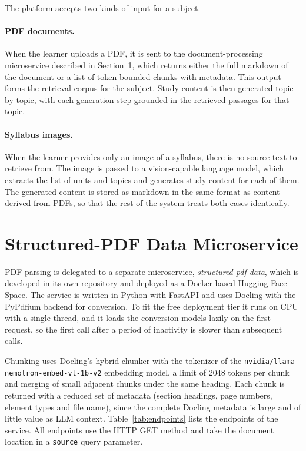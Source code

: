 \documentclass[12pt,a4paper,oneside]{report}
\begin{document}
The platform accepts two kinds of input for a subject.

\paragraph{PDF documents.} When the learner uploads a PDF, it is sent to
the document-processing microservice described in
Section~\ref{sec:pdfservice}, which returns either the full markdown of
the document or a list of token-bounded chunks with metadata. This output
forms the retrieval corpus for the subject. Study content is then
generated topic by topic, with each generation step grounded in the
retrieved passages for that topic.

\paragraph{Syllabus images.} When the learner provides only an image of a
syllabus, there is no source text to retrieve from. The image is passed to
a vision-capable language model, which extracts the list of units and
topics and generates study content for each of them. The generated content
is stored as markdown in the same format as content derived from PDFs, so
that the rest of the system treats both cases identically.

\section{Structured-PDF Data Microservice}\label{sec:pdfservice}

PDF parsing is delegated to a separate microservice, \emph{structured-pdf-data},
which is developed in its own repository and deployed as a Docker-based
Hugging Face Space. The service is written in Python with FastAPI and uses
Docling \cite{auer2024docling} with the PyPdfium backend for conversion.
To fit the free deployment tier it runs on CPU with a single thread, and
it loads the conversion models lazily on the first request, so the first
call after a period of inactivity is slower than subsequent calls.

Chunking uses Docling's hybrid chunker with the tokenizer of the
\texttt{nvidia/llama-nemotron-embed-vl-1b-v2} embedding model, a limit of
2048 tokens per chunk and merging of small adjacent chunks under the same
heading. Each chunk is returned with a reduced set of metadata (section
headings, page numbers, element types and file name), since the complete
Docling metadata is large and of little value as LLM context.
Table~\ref{tab:endpoints} lists the endpoints of the service. All
endpoints use the HTTP GET method and take the document location in a
\texttt{source} query parameter.
\end{document}
